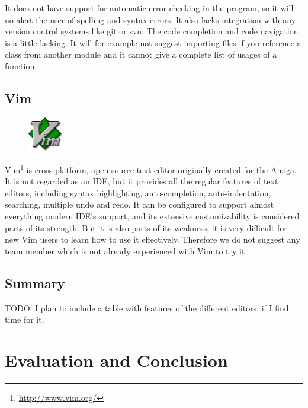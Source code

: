 It does not have support for automatic error checking in the program, so it
will no alert the user of spelling and syntax errors. It also lacks integration
with any version control systems like git or svn. The code completion and
code navigation is a little lacking. It will for example not suggest importing
files if you reference a class from another module and it cannot give a
complete list of usages of a function.

\subsection{Vim}
\begin{figure}
	\vspace{-20pt}
	\includegraphics[width=1.5cm]{./planning/img/vim_logo}
	\vspace{-20pt}
\end{figure}
Vim\footnote{\url{http://www.vim.org/}} is cross-platform, open source text
editor originally created for the Amiga. It is not regarded as an IDE, but it
provides all the regular features of text editors, including syntax
highlighting, auto-completion, auto-indentation, searching, multiple undo and
redo. It can be configured to support almost everything modern IDE’s support,
and its extensive customizability is considered parts of its strength. But it
is also parts of its weakness, it is very difficult for new Vim users to learn
how to use it effectively. Therefore we do not suggest any team member which is
not already experienced with Vim to try it.

\subsection{Summary}
TODO: I plan to include a table with features of the different editors, if I
find time for it.


\section{Evaluation and Conclusion}
\label{sec:pre:eval}

